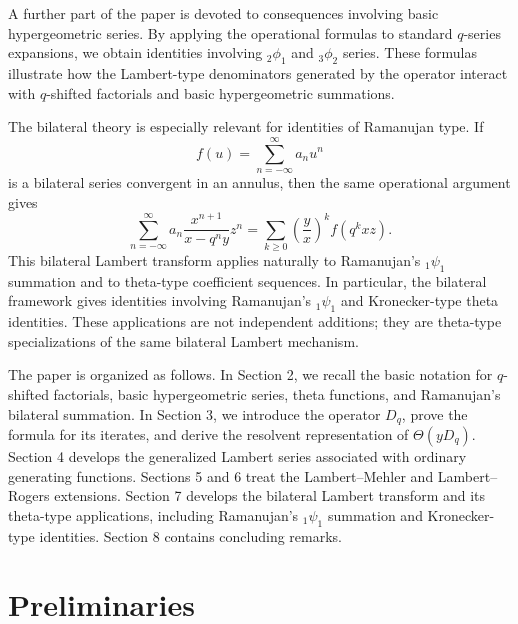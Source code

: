 \documentclass[12pt]{article}
\begin{document}
A further part of the paper is devoted to consequences involving basic
hypergeometric series. By applying the operational formulas to standard
\(q\)-series expansions, we obtain identities involving
\({}_2\phi_1\) and \({}_3\phi_2\) series. These formulas illustrate how
the Lambert-type denominators generated by the operator interact with
\(q\)-shifted factorials and basic hypergeometric summations.

The bilateral theory is especially relevant for identities of
Ramanujan type. If
$$
   f(u)=\sum_{n=-\infty}^{\infty}a_nu^n
$$
is a bilateral series convergent in an annulus, then the same operational argument gives
$$
   \sum_{n=-\infty}^{\infty}a_n
   \frac{x^{n+1}}{x-q^ny}z^n
   =
   \sum_{k\ge0}
   \left(\frac{y}{x}\right)^k f(q^kxz).
$$
This bilateral Lambert transform applies naturally to Ramanujan's
${}_1\psi_1$ summation and to theta-type coefficient sequences. In
particular, the bilateral framework gives identities involving
Ramanujan's ${}_1\psi_1$ and Kronecker-type theta identities. These applications are not independent additions; they are theta-type specializations of the same bilateral
Lambert mechanism.

The paper is organized as follows. In Section 2, we recall the basic notation for $q$-shifted factorials, basic hypergeometric series, theta functions, and Ramanujan's bilateral summation. In Section 3, we introduce the operator $D_q$, prove the formula for its iterates, and derive the resolvent representation of $\Theta(yD_q)$. Section 4 develops the generalized Lambert series associated with ordinary generating functions. Sections 5 and 6 treat the Lambert--Mehler and Lambert--Rogers extensions. Section 7 develops the bilateral Lambert transform and its theta-type applications, including Ramanujan's ${}_1\psi_1$ summation and Kronecker-type identities. Section 8 contains concluding remarks.

\section{Preliminaries}
\end{document}
